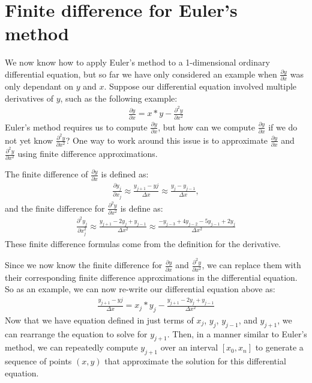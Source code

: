 \documentclass[11pt]{article}
\begin{document}
\section*{Finite difference for Euler's method}
We now know how to apply Euler's method to a 1-dimensional ordinary differential equation, but so far we have only considered an example when $\frac{\partial y}{\partial x}$ was only dependant on $y$ and $x$. Suppose our differential equation involved multiple derivatives of $y$, such as the following example:
\begin{align*}
    \frac{\partial y}{\partial x} = x*y - \frac{\partial^{2} y}{\partial x^{2}}
\end{align*}
Euler's method requires us to compute $\frac{\partial y}{\partial x}$, but how can we compute $\frac{\partial y}{\partial x}$ if we do not yet know $\frac{\partial^{2} y}{\partial x^{2}}$? One way to work around this issue is to approximate $\frac{\partial y}{\partial x}$ and $\frac{\partial^{2} y}{\partial x^{2}}$ using finite difference approximations. 

The finite difference of $\frac{\partial y}{\partial x}$ is defined as:
\begin{align*}
\frac{\partial y_j}{\partial x_j} \approx \frac{y_{j+1}-y{j}}{\Delta x} \approx \frac{y_{j}-y_{j-1}}{\Delta x},
\end{align*}
and the finite difference for $\frac{\partial^{2} y}{\partial x^{2}}$ is define as:
\begin{align*}
\frac{\partial^{2} y_j}{\partial x_j^{2}} \approx \frac{y_{j+1}-2y_{j}+y_{j-1}}{\Delta x^2} \approx \frac{-y_{j-3}+4y_{j-2}-5y_{j-1}+2y_{j}}{\Delta x^2}
\end{align*}
These finite difference formulas come from the definition for the derivative.

Since we now know the finite difference for $\frac{\partial y}{\partial x}$ and $\frac{\partial^{2} y}{\partial x^{2}}$, we can replace them with their corresponding finite difference approximations in the differential equation. So as an example, we can now re-write our differential equation above as:
\begin{align*}
    \frac{y_{j+1}-y{j}}{\Delta x} = x_{j}*y_{j} - \frac{y_{j+1}-2y_{j}+y_{j-1}}{\Delta x^2}
\end{align*}
Now that we have equation defined in just terms of $x_j$, $y_j$, $y_{j-1}$, and $y_{j+1}$, we can rearrange the equation to solve for $y_{j+1}$. Then, in a manner similar to Euler's method, we can repeatedly compute $y_{j+1}$ over an interval $[x_0,x_n]$ to generate a sequence of points $(x,y)$ that approximate the solution for this differential equation.
\end{document}
